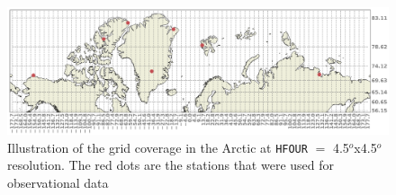 \begin{figure}[ht]
    \centering
    \includegraphics[width = \linewidth]{Chapter5_CTM3setup/images/resolution_map_Arctic.pdf}
    \caption{Illustration of the grid coverage in the Arctic at \texttt{HFOUR} $=$ 4.5$^o$x4.5$^o$ resolution. The red dots are the stations that were used for observational data}
    \label{fig:res_map}
\end{figure}
